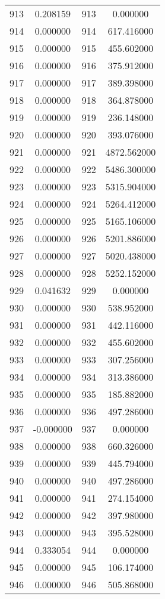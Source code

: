\documentclass[12pt]{article}
\begin{document}
\begin{longtable}{@{}cccc@{}}
913 & 0.208159 & 913 & 0.000000 \\
914 & 0.000000 & 914 & 617.416000 \\
915 & 0.000000 & 915 & 455.602000 \\
916 & 0.000000 & 916 & 375.912000 \\
917 & 0.000000 & 917 & 389.398000 \\
918 & 0.000000 & 918 & 364.878000 \\
919 & 0.000000 & 919 & 236.148000 \\
920 & 0.000000 & 920 & 393.076000 \\
921 & 0.000000 & 921 & 4872.562000 \\
922 & 0.000000 & 922 & 5486.300000 \\
923 & 0.000000 & 923 & 5315.904000 \\
924 & 0.000000 & 924 & 5264.412000 \\
925 & 0.000000 & 925 & 5165.106000 \\
926 & 0.000000 & 926 & 5201.886000 \\
927 & 0.000000 & 927 & 5020.438000 \\
928 & 0.000000 & 928 & 5252.152000 \\
929 & 0.041632 & 929 & 0.000000 \\
930 & 0.000000 & 930 & 538.952000 \\
931 & 0.000000 & 931 & 442.116000 \\
932 & 0.000000 & 932 & 455.602000 \\
933 & 0.000000 & 933 & 307.256000 \\
934 & 0.000000 & 934 & 313.386000 \\
935 & 0.000000 & 935 & 185.882000 \\
936 & 0.000000 & 936 & 497.286000 \\
937 & -0.000000 & 937 & 0.000000 \\
938 & 0.000000 & 938 & 660.326000 \\
939 & 0.000000 & 939 & 445.794000 \\
940 & 0.000000 & 940 & 497.286000 \\
941 & 0.000000 & 941 & 274.154000 \\
942 & 0.000000 & 942 & 397.980000 \\
943 & 0.000000 & 943 & 395.528000 \\
944 & 0.333054 & 944 & 0.000000 \\
945 & 0.000000 & 945 & 106.174000 \\
946 & 0.000000 & 946 & 505.868000 \\

\end{longtable}
\end{document}
